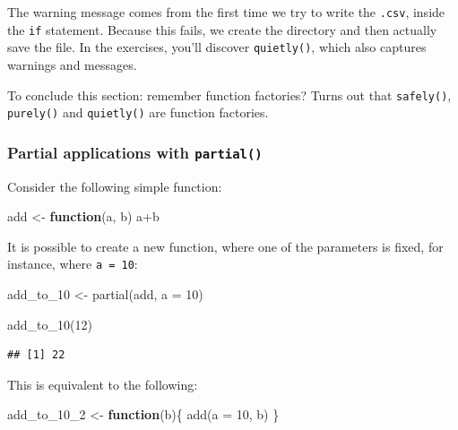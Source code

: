 \documentclass[
]{article}
\newenvironment{Shaded}{\begin{snugshade}}{\end{snugshade}}
\newcommand{\AttributeTok}[1]{\textcolor[rgb]{0.77,0.63,0.00}{#1}}
\newcommand{\ControlFlowTok}[1]{\textcolor[rgb]{0.13,0.29,0.53}{\textbf{#1}}}
\newcommand{\DecValTok}[1]{\textcolor[rgb]{0.00,0.00,0.81}{#1}}
\newcommand{\FunctionTok}[1]{\textcolor[rgb]{0.00,0.00,0.00}{#1}}
\newcommand{\NormalTok}[1]{#1}
\newcommand{\OtherTok}[1]{\textcolor[rgb]{0.56,0.35,0.01}{#1}}
\newcommand{\SpecialCharTok}[1]{\textcolor[rgb]{0.00,0.00,0.00}{#1}}
\begin{document}
The warning message comes from the first time we try to write the \texttt{.csv}, inside the \texttt{if}
statement. Because this fails, we create the directory and then actually save the file.
In the exercises, you'll discover \texttt{quietly()}, which also captures warnings and messages.

To conclude this section: remember function factories? Turns out that \texttt{safely()}, \texttt{purely()} and \texttt{quietly()} are
function factories.

\hypertarget{partial-applications-with-partial}{%
\subsubsection{\texorpdfstring{Partial applications with \texttt{partial()}}{Partial applications with partial()}}\label{partial-applications-with-partial}}

Consider the following simple function:

\begin{Shaded}
\begin{Highlighting}[]
\NormalTok{add }\OtherTok{\textless{}{-}} \ControlFlowTok{function}\NormalTok{(a, b) a}\SpecialCharTok{+}\NormalTok{b}
\end{Highlighting}
\end{Shaded}

It is possible to create a new function, where one of the parameters is fixed, for instance, where
\texttt{a\ =\ 10}:

\begin{Shaded}
\begin{Highlighting}[]
\NormalTok{add\_to\_10 }\OtherTok{\textless{}{-}} \FunctionTok{partial}\NormalTok{(add, }\AttributeTok{a =} \DecValTok{10}\NormalTok{)}
\end{Highlighting}
\end{Shaded}

\begin{Shaded}
\begin{Highlighting}[]
\FunctionTok{add\_to\_10}\NormalTok{(}\DecValTok{12}\NormalTok{)}
\end{Highlighting}
\end{Shaded}

\begin{verbatim}
## [1] 22
\end{verbatim}

This is equivalent to the following:

\begin{Shaded}
\begin{Highlighting}[]
\NormalTok{add\_to\_10\_2 }\OtherTok{\textless{}{-}} \ControlFlowTok{function}\NormalTok{(b)\{}
  \FunctionTok{add}\NormalTok{(}\AttributeTok{a =} \DecValTok{10}\NormalTok{, b)}
\NormalTok{\}}
\end{Highlighting}
\end{Shaded}
\end{document}
